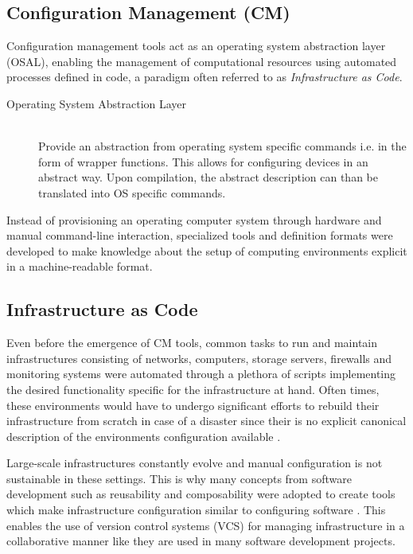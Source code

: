 \subsection{Configuration Management (CM)}

Configuration management tools act as an operating system abstraction layer (OSAL), enabling the management of computational resources using automated processes defined in code, a paradigm often referred to as \textit{Infrastructure as Code}.

\begin{description}
	\item [Operating System Abstraction Layer] \hfill \\
	Provide an abstraction from operating system specific commands i.e. in the form of wrapper functions. This allows for configuring devices in an abstract way. Upon compilation, the abstract description can than be translated into OS specific commands.
\end{description}

Instead of provisioning an operating computer system through hardware and manual command-line interaction, specialized tools and definition formats were developed to make knowledge about the setup of computing environments explicit in a machine-readable format.

\subsection{Infrastructure as Code}

Even before the emergence of CM tools, common tasks to run and maintain infrastructures consisting of networks, computers, storage servers, firewalls and monitoring systems were automated through a plethora of scripts implementing the desired functionality specific for the infrastructure at hand. Often times, these environments would have to undergo significant efforts to rebuild their infrastructure from scratch in case of a disaster since their is no explicit canonical description of the environments configuration available \cite{Huttermann2012}.

Large-scale infrastructures constantly evolve and manual configuration is not sustainable in these settings. This is why many concepts from software development such as reusability and composability were adopted to create tools which make infrastructure configuration similar to configuring software \cite{kanies2006puppet}. This enables the use of version control systems (VCS) for managing infrastructure in a collaborative manner like they are used in many software development projects.

